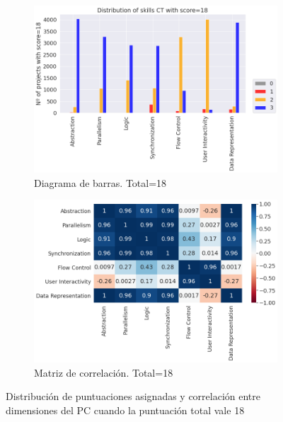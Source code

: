 \documentclass[a4paper, 12pt]{book}
\begin{document}
\begin{figure}[H]
    \centering
    \begin{subfigure}[h]{.49\textwidth} 
        \includegraphics[width=\textwidth]{img/distribucion_18_Scratch}
        \caption{Diagrama de barras. Total=18}
        \label{fig:total18}
    \end{subfigure}       
    \begin{subfigure}[h]{.49\textwidth} 
        \includegraphics[width=\textwidth]{img/corr_18_Scratch}
        \caption{Matriz de correlación. Total=18}
        \label{fig:corr18}
    \end{subfigure}
     \caption{Distribución de puntuaciones asignadas y correlación entre dimensiones del PC cuando la puntuación total vale 18}
\end{figure}
\end{document}

